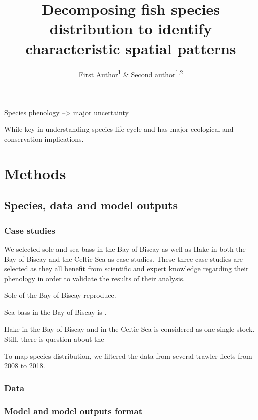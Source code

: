 \documentclass[
  man]{apa6}
\title{Decomposing fish species distribution to identify characteristic spatial patterns}
\author{First Author\textsuperscript{1} \& Second author\textsuperscript{1,2}}
\date{}
\affiliation{\vspace{0.5cm}\textsuperscript{1} Institution 1\\\textsuperscript{2} Institution 2}
\begin{document}
\maketitle

Species phenology --\textgreater{} major uncertainty

While key in understanding species life cycle and has major ecological and conservation implications.

\hypertarget{methods}{%
\section{Methods}\label{methods}}

\hypertarget{species-data-and-model-outputs}{%
\subsection{Species, data and model outputs}\label{species-data-and-model-outputs}}

\hypertarget{case-studies}{%
\subsubsection{Case studies}\label{case-studies}}

We selected sole and sea bass in the Bay of Biscay as well as Hake in both the Bay of Biscay and the Celtic Sea as case studies. These three case studies are selected as they all benefit from scientific and expert knowledge regarding their phenology in order to validate the results of their analysis.

Sole of the Bay of Biscay reproduce.

Sea bass in the Bay of Biscay is .

Hake in the Bay of Biscay and in the Celtic Sea is considered as one single stock. Still, there is question about the

To map species distribution, we filtered the data from several trawler fleets from 2008 to 2018.

\hypertarget{data}{%
\subsubsection{Data}\label{data}}

\hypertarget{model-and-model-outputs-format}{%
\subsubsection{Model and model outputs format}\label{model-and-model-outputs-format}}
\end{document}
